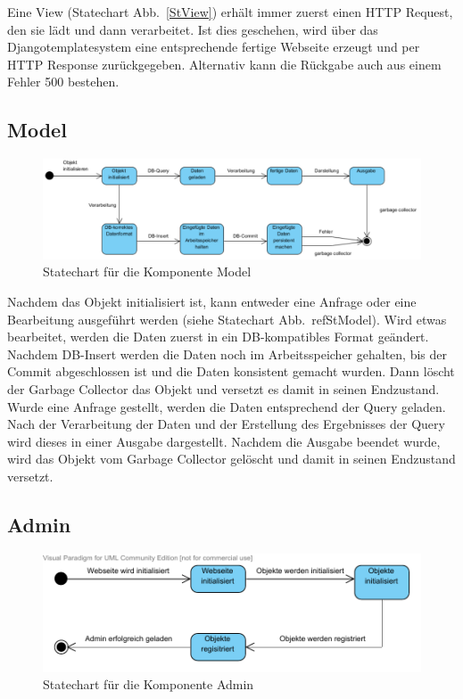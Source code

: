 Eine View (Statechart Abb.\ \ref{StView}) erhält immer zuerst einen HTTP 
Request, den sie lädt und dann verarbeitet. Ist dies geschehen, wird über das 
Djangotemplatesystem eine entsprechende fertige Webseite erzeugt und per HTTP 
Response zurückgegeben. Alternativ kann die Rückgabe auch aus einem Fehler 500 
bestehen.

\subsection{Model}
\begin{figure}
\includegraphics[width=0.8\linewidth]{bilder/KompModel.pdf}
\caption{Statechart für die Komponente Model}
\label{StModel}
\end{figure}

Nachdem das Objekt initialisiert ist, kann entweder eine Anfrage oder eine
Bearbeitung ausgeführt werden (siehe Statechart Abb.\ ref{StModel}). Wird etwas 
bearbeitet, werden die Daten zuerst in ein DB-kompatibles Format geändert. 
Nachdem DB-Insert werden die Daten noch im Arbeitsspeicher gehalten, bis der 
Commit abgeschlossen ist und die Daten konsistent gemacht wurden. Dann löscht 
der Garbage Collector das Objekt und versetzt es damit in seinen Endzustand. 
Wurde eine Anfrage gestellt, werden die Daten entsprechend der Query geladen. 
Nach der Verarbeitung der Daten und der Erstellung des Ergebnisses der Query 
wird dieses in einer Ausgabe dargestellt. Nachdem die Ausgabe beendet wurde, 
wird das Objekt vom Garbage Collector gelöscht und damit in seinen Endzustand 
versetzt.

\subsection{Admin}
\begin{figure}
\includegraphics[width=0.8\linewidth]{bilder/KompAdmin.pdf}
\caption{Statechart für die Komponente Admin}
\label{StAdmin}
\end{figure}

